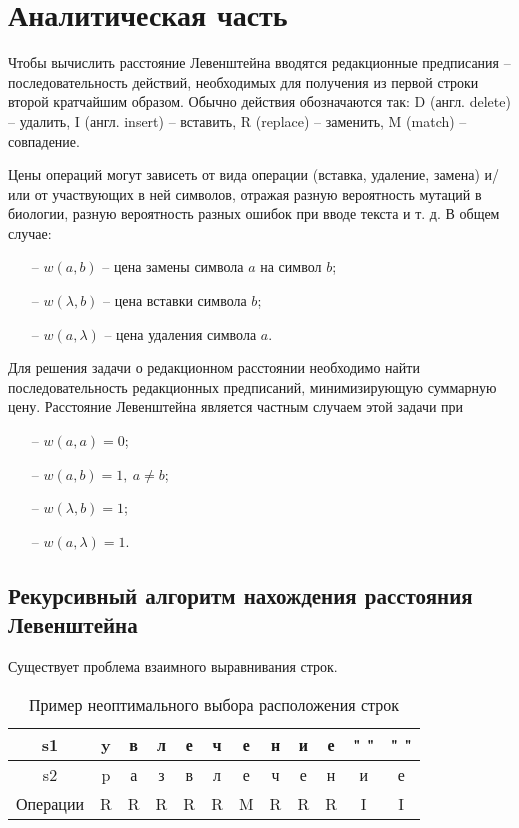 \chapter{Аналитическая часть}

Чтобы вычислить расстояние Левенштейна вводятся редакционные предписания -- последовательность действий, необходимых для получения из первой строки второй кратчайшим образом. Обычно действия обозначаются так: D (англ. delete) -- удалить, I (англ. insert) -- вставить, R (replace) -- заменить, M (match) -- совпадение.

Цены операций могут зависеть от вида операции (вставка, удаление, замена) и/или от участвующих в ней символов, отражая разную вероятность мутаций в биологии, разную вероятность разных ошибок при вводе текста и т. д. В общем случае:
\begin{itemize}
	\item[--] $w(a,b)$ -- цена замены символа $a$ на символ $b$;
	\item[--] $w(\lambda,b)$ -- цена вставки символа $b$;
	\item[--] $w(a,\lambda)$ -- цена удаления символа $a$.
\end{itemize}

Для решения задачи о редакционном расстоянии необходимо найти последовательность редакционных предписаний, минимизирующую суммарную цену. Расстояние Левенштейна является частным случаем этой задачи при
\begin{itemize}
	\item[--] $w(a,a)=0$;
	\item[--] $w(a,b)=1, \medspace a \neq b$;
	\item[--] $w(\lambda,b)=1$;
	\item[--] $w(a,\lambda)=1$.
\end{itemize}

\clearpage

\section{Рекурсивный алгоритм нахождения расстояния Левенштейна}

Существует проблема взаимного выравнивания строк.

\begin{table}[h]
	\begin{center}
		\caption{\label{tabular:ex} Пример неоптимального выбора расположения строк}
			\begin{tabular}{c|c|c|c|c|c|c|c|c|c|c|c}
				s1 & y & в & л & е & ч & е & н & и & е & " " & " " \\
				\hline
				s2 & p & а & з & в & л & е & ч & е & н & и & е \\
				\hline
				Операции & R & R & R & R & R & M & R & R & R & I & I
			\end{tabular}
	\end{center}
\end{table}

